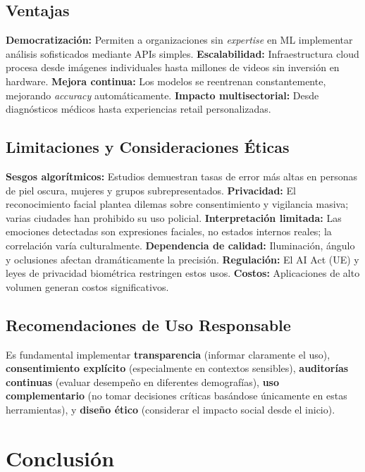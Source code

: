 \documentclass[12pt,a4paper]{article}
\begin{document}
\subsection{Ventajas}

\textbf{Democratización:} Permiten a organizaciones sin \textit{expertise} en ML implementar análisis sofisticados mediante APIs simples. \textbf{Escalabilidad:} Infraestructura cloud procesa desde imágenes individuales hasta millones de videos sin inversión en hardware. \textbf{Mejora continua:} Los modelos se reentrenan constantemente, mejorando \textit{accuracy} automáticamente. \textbf{Impacto multisectorial:} Desde diagnósticos médicos hasta experiencias retail personalizadas.

\subsection{Limitaciones y Consideraciones Éticas}

\textbf{Sesgos algorítmicos:} Estudios demuestran tasas de error más altas en personas de piel oscura, mujeres y grupos subrepresentados. \textbf{Privacidad:} El reconocimiento facial plantea dilemas sobre consentimiento y vigilancia masiva; varias ciudades han prohibido su uso policial. \textbf{Interpretación limitada:} Las emociones detectadas son expresiones faciales, no estados internos reales; la correlación varía culturalmente. \textbf{Dependencia de calidad:} Iluminación, ángulo y oclusiones afectan dramáticamente la precisión. \textbf{Regulación:} El AI Act (UE) y leyes de privacidad biométrica restringen estos usos. \textbf{Costos:} Aplicaciones de alto volumen generan costos significativos.

\subsection{Recomendaciones de Uso Responsable}

Es fundamental implementar \textbf{transparencia} (informar claramente el uso), \textbf{consentimiento explícito} (especialmente en contextos sensibles), \textbf{auditorías continuas} (evaluar desempeño en diferentes demografías), \textbf{uso complementario} (no tomar decisiones críticas basándose únicamente en estas herramientas), y \textbf{diseño ético} (considerar el impacto social desde el inicio).

\section{Conclusión}
\end{document}
